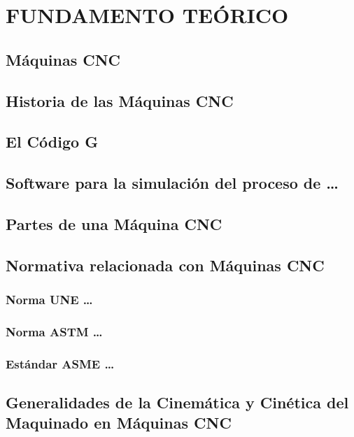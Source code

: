 \section{FUNDAMENTO TEÓRICO}

\subsection{Máquinas CNC}

\subsection{Historia de las Máquinas CNC}

\subsection{El Código G}

\subsection{Software para la simulación del proceso de \ldots}

\subsection{Partes de una Máquina CNC}

\subsection{Normativa relacionada con Máquinas CNC}

\subsubsection{Norma UNE \ldots}

\subsubsection{Norma ASTM \ldots}

\subsubsection{Estándar ASME \ldots}

\subsection{Generalidades de la Cinemática y Cinética del Maquinado en Máquinas CNC}

